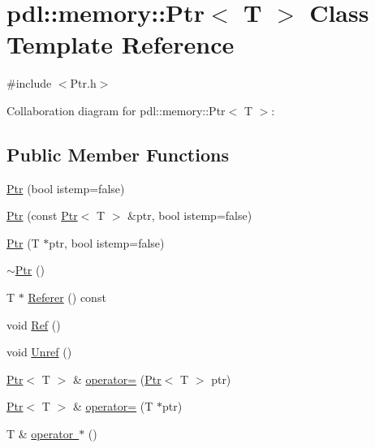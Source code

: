 \hypertarget{classpdl_1_1memory_1_1_ptr}{}\section{pdl\+::memory\+::Ptr$<$ T $>$ Class Template Reference}
\label{classpdl_1_1memory_1_1_ptr}


{\ttfamily \#include $<$Ptr.\+h$>$}



Collaboration diagram for pdl\+::memory\+::Ptr$<$ T $>$\+:
\subsection*{Public Member Functions}
\begin{DoxyCompactItemize}
\item 
\mbox{\hyperlink{classpdl_1_1memory_1_1_ptr_aa9dbd0e26ac63e2856efcdafdd111367}{Ptr}} (bool istemp=false)
\item 
\mbox{\hyperlink{classpdl_1_1memory_1_1_ptr_a4b88cee927abda85830ad0b8f0019ba7}{Ptr}} (const \mbox{\hyperlink{classpdl_1_1memory_1_1_ptr}{Ptr}}$<$ T $>$ \&ptr, bool istemp=false)
\item 
\mbox{\hyperlink{classpdl_1_1memory_1_1_ptr_aed800c8ea80081c922999a065bb187ca}{Ptr}} (T $\ast$ptr, bool istemp=false)
\item 
\mbox{\hyperlink{classpdl_1_1memory_1_1_ptr_a225842e4bc19301f56a53777867d4fb2}{$\sim$\+Ptr}} ()
\item 
T $\ast$ \mbox{\hyperlink{classpdl_1_1memory_1_1_ptr_a42c83ce4bb17fe651fc2f39c26e3ecb9}{Referer}} () const
\item 
void \mbox{\hyperlink{classpdl_1_1memory_1_1_ptr_a71ca948c9a456d495024b7f083ba6bbf}{Ref}} ()
\item 
void \mbox{\hyperlink{classpdl_1_1memory_1_1_ptr_a19c568ab879ed793863b793c860b6abc}{Unref}} ()
\item 
\mbox{\hyperlink{classpdl_1_1memory_1_1_ptr}{Ptr}}$<$ T $>$ \& \mbox{\hyperlink{classpdl_1_1memory_1_1_ptr_a1d6a9d6523f7e820eb53cfaeb2d89b6a}{operator=}} (\mbox{\hyperlink{classpdl_1_1memory_1_1_ptr}{Ptr}}$<$ T $>$ ptr)
\item 
\mbox{\hyperlink{classpdl_1_1memory_1_1_ptr}{Ptr}}$<$ T $>$ \& \mbox{\hyperlink{classpdl_1_1memory_1_1_ptr_a56d7b4d4c745bc4e2ff38b983174dfd9}{operator=}} (T $\ast$ptr)
\item 
T \& \mbox{\hyperlink{classpdl_1_1memory_1_1_ptr_a389e5852aa1afb023b558765057cee46}{operator $\ast$}} ()

\end{DoxyCompactItemize}

